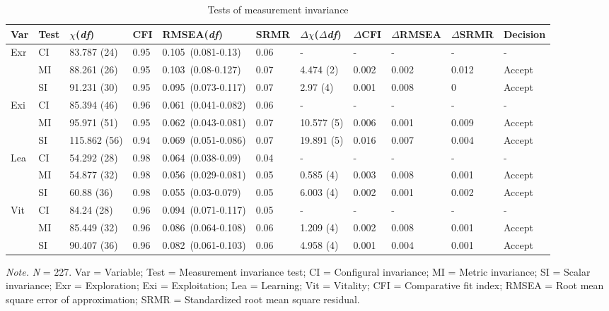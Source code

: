 \documentclass[man]{apa7}
\begin{document}
\begin{sidewaystable}[ht]
\caption{Tests of measurement invariance}
\centering

\begin{tabular}{p{1.0cm}p{1.0cm}p{2.2cm}p{1cm}p{3.7cm}p{1cm}p{2cm}p{1.7cm}p{1.7cm}p{1.7cm}p{2cm}}
  \toprule
Var & Test & $\chi$(\textit{df}) & CFI & RMSEA(\textit{df}) & SRMR & $\Delta\chi$($\Delta$\textit{df}) & $\Delta$CFI & $\Delta$RMSEA & $\Delta$SRMR & Decision \\ 
  \midrule
Exr & CI & 83.787 (24) & 0.95 & 0.105\ (0.081-0.13) & 0.06 & - & - & - & - & - \\ 
   & MI & 88.261 (26) & 0.95 & 0.103\ (0.08-0.127) & 0.07 & 4.474 (2) & 0.002 & 0.002 & 0.012 & Accept \\ 
   & SI & 91.231 (30) & 0.95 & 0.095\ (0.073-0.117) & 0.07 & 2.97 (4) & 0.001 & 0.008 & 0 & Accept \\ 
  Exi & CI & 85.394 (46) & 0.96 & 0.061\ (0.041-0.082) & 0.06 & - & - & - & - & - \\ 
   & MI & 95.971 (51) & 0.95 & 0.062\ (0.043-0.081) & 0.07 & 10.577 (5) & 0.006 & 0.001 & 0.009 & Accept \\ 
   & SI & 115.862 (56) & 0.94 & 0.069\ (0.051-0.086) & 0.07 & 19.891 (5) & 0.016 & 0.007 & 0.004 & Accept \\ 
  Lea & CI & 54.292 (28) & 0.98 & 0.064\ (0.038-0.09) & 0.04 & - & - & - & - & - \\ 
   & MI & 54.877 (32) & 0.98 & 0.056\ (0.029-0.081) & 0.05 & 0.585 (4) & 0.003 & 0.008 & 0.001 & Accept \\ 
   & SI & 60.88 (36) & 0.98 & 0.055\ (0.03-0.079) & 0.05 & 6.003 (4) & 0.002 & 0.001 & 0.002 & Accept \\ 
  Vit & CI & 84.24 (28) & 0.96 & 0.094\ (0.071-0.117) & 0.05 & - & - & - & - & - \\ 
   & MI & 85.449 (32) & 0.96 & 0.086\ (0.064-0.108) & 0.06 & 1.209 (4) & 0.002 & 0.008 & 0.001 & Accept \\ 
   & SI & 90.407 (36) & 0.96 & 0.082\ (0.061-0.103) & 0.06 & 4.958 (4) & 0.001 & 0.004 & 0.001 & Accept \\  
   \bottomrule
\end{tabular}
\smallskip
\begin{tablenotes}
{\small
\textit{Note.} \textit{N} = 227. Var = Variable; Test = Measurement invariance test; CI = Configural invariance; MI = Metric invariance; SI = Scalar invariance; Exr = Exploration; Exi = Exploitation; Lea = Learning; Vit = Vitality; CFI = Comparative fit index; RMSEA = Root mean square error of approximation; SRMR = Standardized root mean square residual.
}
\end{tablenotes}
\end{sidewaystable}
\end{document}
